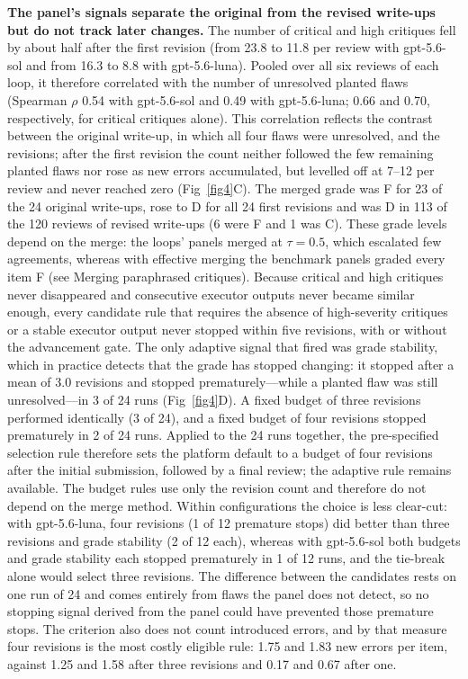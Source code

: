 \textbf{The panel's signals separate the original from the revised write-ups but do not track later changes.} The number of critical and high critiques fell by about half after the first revision (from 23.8 to 11.8 per review with gpt-5.6-sol and from 16.3 to 8.8 with gpt-5.6-luna). Pooled over all six reviews of each loop, it therefore correlated with the number of unresolved planted flaws (Spearman $\rho$ 0.54 with gpt-5.6-sol and 0.49 with gpt-5.6-luna; 0.66 and 0.70, respectively, for critical critiques alone). This correlation reflects the contrast between the original write-up, in which all four flaws were unresolved, and the revisions; after the first revision the count neither followed the few remaining planted flaws nor rose as new errors accumulated, but levelled off at 7--12 per review and never reached zero (Fig~\ref{fig4}C). The merged grade was F for 23 of the 24 original write-ups, rose to D for all 24 first revisions and was D in 113 of the 120 reviews of revised write-ups (6 were F and 1 was C). These grade levels depend on the merge: the loops' panels merged at $\tau=0.5$, which escalated few agreements, whereas with effective merging the benchmark panels graded every item F (see Merging paraphrased critiques). Because critical and high critiques never disappeared and consecutive executor outputs never became similar enough, every candidate rule that requires the absence of high-severity critiques or a stable executor output never stopped within five revisions, with or without the advancement gate. The only adaptive signal that fired was grade stability, which in practice detects that the grade has stopped changing: it stopped after a mean of 3.0 revisions and stopped prematurely---while a planted flaw was still unresolved---in 3 of 24 runs (Fig~\ref{fig4}D). A fixed budget of three revisions performed identically (3 of 24), and a fixed budget of four revisions stopped prematurely in 2 of 24 runs. Applied to the 24 runs together, the pre-specified selection rule therefore sets the platform default to a budget of four revisions after the initial submission, followed by a final review; the adaptive rule remains available. The budget rules use only the revision count and therefore do not depend on the merge method. Within configurations the choice is less clear-cut: with gpt-5.6-luna, four revisions (1 of 12 premature stops) did better than three revisions and grade stability (2 of 12 each), whereas with gpt-5.6-sol both budgets and grade stability each stopped prematurely in 1 of 12 runs, and the tie-break alone would select three revisions. The difference between the candidates rests on one run of 24 and comes entirely from flaws the panel does not detect, so no stopping signal derived from the panel could have prevented those premature stops. The criterion also does not count introduced errors, and by that measure four revisions is the most costly eligible rule: 1.75 and 1.83 new errors per item, against 1.25 and 1.58 after three revisions and 0.17 and 0.67 after one.

